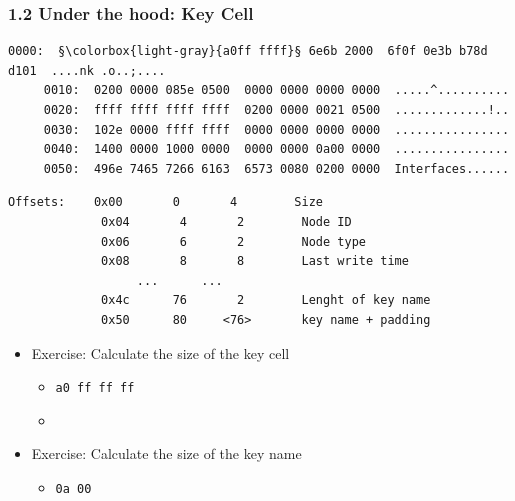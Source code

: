 \begin{frame}[fragile]
  \frametitle{1.2 Under the hood: Key Cell}
  \begin{lstlisting}[basicstyle=\tiny,escapechar=§]
     0000:  §\colorbox{light-gray}{a0ff ffff}§ 6e6b 2000  6f0f 0e3b b78d d101  ....nk .o..;....
     0010:  0200 0000 085e 0500  0000 0000 0000 0000  .....^..........
     0020:  ffff ffff ffff ffff  0200 0000 0021 0500  .............!..
     0030:  102e 0000 ffff ffff  0000 0000 0000 0000  ................
     0040:  1400 0000 1000 0000  0000 0000 0a00 0000  ................
     0050:  496e 7465 7266 6163  6573 0080 0200 0000  Interfaces......
  \end{lstlisting}
  \begin{lstlisting}[basicstyle=\tiny]
 Offsets:    0x00       0       4        Size
             0x04       4       2        Node ID
             0x06       6       2        Node type
             0x08       8       8        Last write time
                  ...      ...
             0x4c      76       2        Lenght of key name
             0x50      80     <76>       key name + padding
  \end{lstlisting}
  \begin{itemize}
      \item Exercise: Calculate the size of the key cell
      \begin{itemize}
          \item[] \texttt{a0 ff ff ff}
          \item[]
      \end{itemize}
      \item Exercise: Calculate the size of the key name
      \begin{itemize}
          \item[] \texttt{0a 00}
      \end{itemize}
  \end{itemize}
\end{frame}


